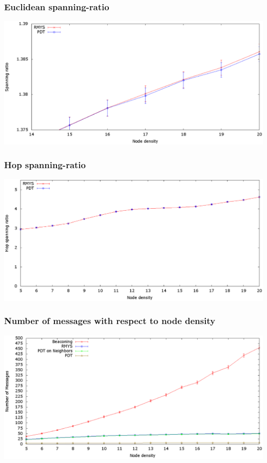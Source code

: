 \documentclass[compress]{beamer}
\begin{document}
\begin{frame} 
\frametitle{Euclidean spanning-ratio}
\center	\includegraphics[width=1.0\linewidth]{RMYS_PDT_SpanningRatio-hd.eps}
\end{frame}

\begin{frame} 
\frametitle{Hop spanning-ratio}
\center	\includegraphics[width=1.0\linewidth]{RMYS_PDT_HopSpanningRatio.eps}
\end{frame}

\begin{frame} 
\frametitle{Number of messages with respect to node density}
\center	\includegraphics[width=1.0\linewidth]{RMYS_PDT_Beaconing_Neighbors.eps}
\end{frame}
\end{document}
